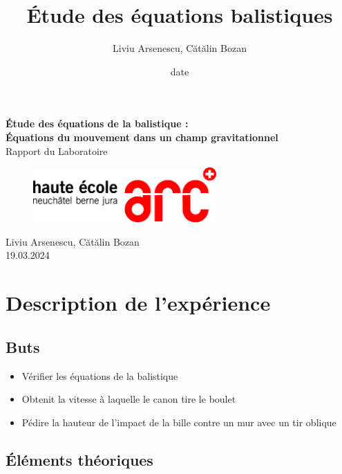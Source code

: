 \documentclass[12pt,a4paper]{article}
\title{Étude des équations balistiques}
\author{Liviu Arsenescu, Cătălin Bozan}
\date{date}
\begin{document}
    \begin{titlepage}
        \begin{center}
            \vspace*{\fill}
            \Huge \textbf{Étude des équations de la balistique :} \\
            \Huge \textbf{Équations du mouvement dans un champ gravitationnel} \\
            \Large Rapport du Laboratoire \\
            \begin{figure}[h]
                \centering
                \includegraphics[width=7cm]{hearclogo.png}
            \end{figure}
            \vspace{\fill}
            \Large Liviu Arsenescu, Cătălin Bozan \\
            19.03.2024

            \vspace*{\fill}
        \end{center}
    \end{titlepage}

    \thispagestyle{empty}
    \tableofcontents
    \newpage

    \section{Description de l'expérience}
    \subsection{Buts}
    \begin{itemize}
        \item Vérifier les équations de la balistique
        \item Obtenit la vitesse à laquelle le canon tire le boulet
        \item Pédire la hauteur de l'impact de la bille contre un mur avec un tir oblique
    \end{itemize}

    \subsection{Éléments théoriques}
\end{document}
